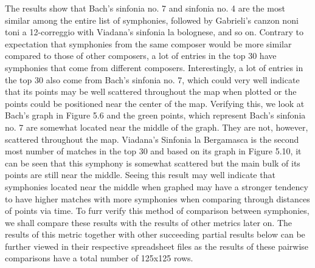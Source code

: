 The results show that Bach’s sinfonia no. 7 and sinfonia no. 4 are the most similar among the entire list of symphonies, followed by Gabrieli’s canzon noni toni a 12-correggio with Viadana’s sinfonia la bolognese, and so on. Contrary to expectation that symphonies from the same composer would be more similar compared to those of other composers, a lot of entries in the top 30 have symphonies that come from different composers. Interestingly, a lot of entries in the top 30 also come from Bach’s sinfonia no. 7, which could very well indicate that its points may be well scattered throughout the map when plotted or the points could be positioned near the center of the map. Verifying this, we look at Bach’s graph in Figure 5.6 and the green points, which represent Bach’s sinfonia no. 7 are somewhat located near the middle of the graph. They are not, however, scattered throughout the map. Viadana’s Sinfonia la Bergamasca is the second most number of matches in the top 30 and based on its graph in Figure 5.10, it can be seen that this symphony is somewhat scattered but the main bulk of its points are still near the middle. Seeing this result may well indicate that symphonies located near the middle when graphed may have a stronger tendency to have higher matches with more symphonies when comparing through distances of points via time. To furr verify this method of comparison between symphonies, we shall compare these results with the results of other metrics later on. The results of this metric together with other succeeding partial results below can be further viewed in their respective spreadsheet files as the results of these pairwise comparisons have a total number of 125x125 rows.

